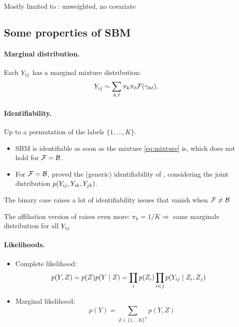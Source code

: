 \ra Mostly limited to \SBMo: unweighted, no covariate

\blank
\subsection{Some properties of SBM}

\jump \paragraph{Marginal distribution.} Each ${Y_{ij}}$ has a marginal mixture distribution:
\begin{equation} \label{eq:mixture}
{Y_{ij}} \sim \sum_{k, \ell} \pi_k \pi_\ell \mathcal{F}(\gamma_{k\ell}).
\end{equation}

\jump \paragraph{Identifiability.} Up to a permutation of the labels $\{1, \dots, K\}$.
\begin{itemize}
\item SBM is identifiable as soon as the mixture \eqref{eq:mixture} is, which does
not hold for $\mathcal{F} = \mathcal{B}$.
\item For $\mathcal{F} = \mathcal{B}$, \cite{AMR09} proved the (generic) identifiability of \SBMo, considering the joint distribution $p({Y_{ij}}, Y_{ik}, Y_{jk})$.
\end{itemize}

\ra The binary case raises a lot of identifiability issues that vanish when $\mathcal{F} \neq \mathcal{B}$ 

\ra The affiliation version of \SBMo raises even more: $\pi_k = 1/K \Rightarrow$ same marginale distribution for all ${Y_{ij}}$

\jump \paragraph{Likelihoods.}
\begin{itemize}
\item Complete likelihood:
\begin{align} \label{eq:complik}
    p(Y, Z) 
    = p(Z) p(Y \mid Z) 
    & = \prod_i p(Z_i) \prod_{i < j} p(\Yij \mid Z_i, Z_j) %
\end{align}
\item Marginal likelihood:
\begin{equation*} 
    p(Y) = \sum_{Z \in \{1, \dots K\}^n} p(Y, Z)
\end{equation*}
\end{itemize}


